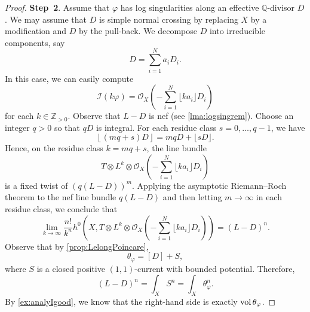 \begin{proof}
    \textbf{Step~2}. Assume that $\varphi$ has log singularities along an effective $\mathbb{Q}$-divisor $D$. We may assume that $D$ is simple normal crossing by replacing $X$ by a modification and $D$ by the pull-back. We decompose $D$ into irreducible components, say
    \[
        D=\sum_{i=1}^N a_iD_i.
    \]
    In this case, we can easily compute
    \[
        \mathcal{I}(k\varphi)=\mathcal{O}_X\left(-\sum_{i=1}^N\lfloor k a_i \rfloor D_i\right)
    \]
    for each $k\in \mathbb{Z}_{>0}$.
    Observe that $L-D$ is nef (see \cref{lma:logsingrem}). Choose an integer $q>0$ so that $qD$ is integral. For each residue class $s=0,\ldots,q-1$, we have
    \[
        \left\lfloor (mq+s)D\right\rfloor=mqD+\lfloor sD\rfloor.
    \]
    Hence, on the residue class $k=mq+s$, the line bundle
    \[
        T\otimes L^k\otimes \mathcal{O}_X\left(-\sum_{i=1}^N\lfloor k a_i \rfloor D_i\right)
    \]
    is a fixed twist of $\left(q(L-D)\right)^m$. Applying the asymptotic Riemann--Roch theorem \cite[Corollary~1.4.41]{PAG1} to the nef line bundle $q(L-D)$ and then letting $m\to\infty$ in each residue class, we conclude that
    \[
        \lim_{k\to\infty}\frac{n!}{k^n}h^0\left(X,T\otimes L^k\otimes \mathcal{O}_X\left(-\sum_{i=1}^N\lfloor k a_i \rfloor D_i\right)\right)= (L-D)^n.
    \]
    Observe that by \cref{prop:LelongPoincare},
    \[
        \theta_{\varphi}=[D]+S,
    \]
    where $S$ is a closed positive $(1,1)$-current with bounded potential. Therefore,
    \[
        (L-D)^n=\int_X S^n=\int_X  \theta_{\varphi}^n.
    \]
    By \cref{ex:analyIgood}, we know that the right-hand side is exactly $\operatorname{vol} \theta_{\varphi}$.
\end{proof}

